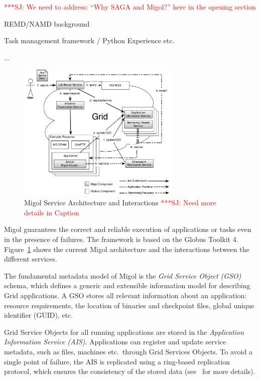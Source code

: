 \documentclass[times, 10pt,twocolumn]{article}
\newcommand{\jhanote}[1]{ {\textcolor{red} { ***SJ: #1 }}}
\begin{document}
\jhanote{We need to address: ``Why SAGA and Migol?'' here in the
  opening section}



REMD/NAMD background

Task management framework  / Python Experience etc.

...                                  


\label{sec:migol}

\begin{figure}[t]
            \centering
                \includegraphics[width=0.7\textwidth]{migol_architecture}
            \caption{Migol Service Architecture and Interactions \jhanote{Need more details in  Caption} }
            \label{fig:migol_architecture} 
\end{figure}           


Migol guarantees the correct and reliable exe\-cution of applications or tasks even in
the presence of  failures. The framework is based on the Globus Toolkit 4. 
Figure~\ref{fig:migol_architecture} shows the current Migol architecture and 
the interactions between the different services.

The fundamental metadata model of Migol is the \emph{Grid Service Object (GSO)} schema,
which defines a generic and extensible information model for
describing Grid applications.  
A GSO stores all relevant information about an application: resource requirements,
the location of binaries and checkpoint files, global unique identifier (GUID),
etc.

Grid Service Objects for all running applications are stored in 
the {\em Application Information Service (AIS)}. 
Applications can register and update service metadata, 
such as files, machines etc.\ through Grid Services Objects. 
To avoid a single point of failure, the AIS is replicated using a ring-based
replication protocol, which ensures  the consistency of the stored data
(see~\cite{Luckow:2008ys} for more details).
\end{document}
